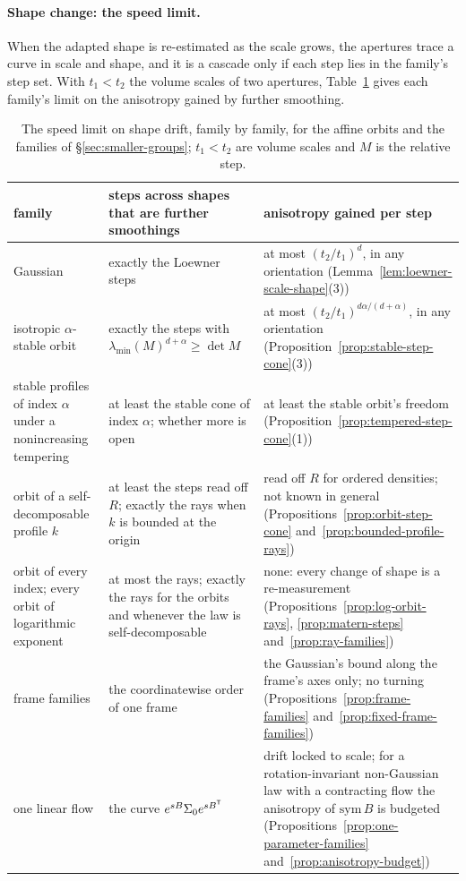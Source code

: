 \paragraph{Shape change: the speed limit.} When the adapted shape is re-estimated as the scale grows, the
apertures trace a curve in scale and shape, and it is a cascade only if each step lies in the family's
step set. With $t_1 < t_2$ the volume scales of two apertures, Table~\ref{tab:speed-limit} gives each family's
limit on the anisotropy gained by further smoothing.

\begin{table}[tp]
\centering
\small
\setlength{\tabcolsep}{4pt}
\renewcommand{\arraystretch}{1.15}
\begin{tabular}{@{}p{}p{}p{}@{}}
\toprule
family & steps across shapes that are further smoothings & anisotropy gained per step \\
\midrule
Gaussian & exactly the Loewner steps & at most $(t_2/t_1)^d$, in any orientation
(Lemma~\ref{lem:loewner-scale-shape}(3)) \\
isotropic $\alpha$-stable orbit & exactly the steps with $\lambda_{\min}(M)^{d+\alpha} \ge \det M$ &
at most $(t_2/t_1)^{d\alpha/(d+\alpha)}$, in any orientation (Proposition~\ref{prop:stable-step-cone}(3)) \\
stable profiles of index $\alpha$ under a nonincreasing tempering & at least the stable cone of index
$\alpha$; whether more is open & at least the stable orbit's freedom
(Proposition~\ref{prop:tempered-step-cone}(1)) \\
orbit of a self-decomposable profile $k$ & at least the steps read off $R$; exactly the rays when $k$ is
bounded at the origin & read off $R$ for ordered densities; not known in general
(Propositions~\ref{prop:orbit-step-cone} and~\ref{prop:bounded-profile-rays}) \\
\Matern{} orbit of every index; every orbit of logarithmic exponent & at most the rays; exactly the
rays for the \Matern{} orbits and whenever the law is self-decomposable & none: every change of shape
is a re-measurement (Propositions~\ref{prop:log-orbit-rays}, \ref{prop:matern-steps}
and~\ref{prop:ray-families}) \\
frame families & the coordinatewise order of one frame & the Gaussian's bound along the frame's axes
only; no turning (Propositions~\ref{prop:frame-families} and~\ref{prop:fixed-frame-families}) \\
one linear flow & the curve $e^{sB}\Sigma_0e^{sB^{\mathsf{T}}}$ & drift locked to scale; for a rotation-invariant
non-Gaussian law with a contracting flow the anisotropy of $\mathrm{sym}\,B$ is budgeted
(Propositions~\ref{prop:one-parameter-families} and~\ref{prop:anisotropy-budget}) \\
\bottomrule
\end{tabular}
\caption{The speed limit on shape drift, family by family, for the affine orbits and the families of
\S\ref{sec:smaller-groups}; $t_1 < t_2$ are volume scales and $M$ is the relative step.}
\label{tab:speed-limit}
\end{table}

